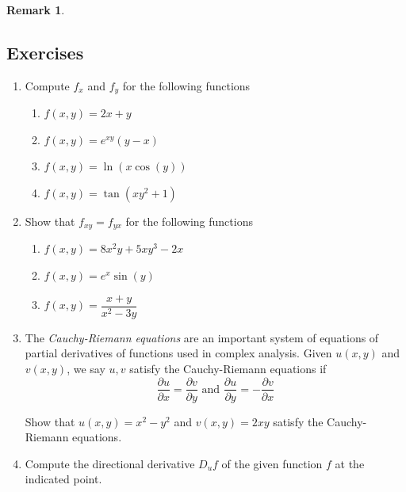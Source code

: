 \documentclass[12pt]{article}
\numberwithin{equation}{subsection}
\numberwithin{figure}{subsection}
\theoremstyle{note}
\newtheorem{remark}[subsection]{Remark}
\begin{document}
{\begin{remark}
\end{remark}





\subsection{Exercises}
\begin{enumerate}[label=\arabic*.]
\item Compute $f_x$ and $f_y$ for the following functions

\begin{enumerate}
	\item $f(x,y)=2x+y$
	\item $f(x,y)=e^{xy}(y-x)$
	\item $f(x,y)=\ln(x\cos(y))$
	\item $f(x,y)=\tan(xy^2+1)$
\end{enumerate}


\item Show that $f_{xy}=f_{yx}$ for the following functions

\begin{enumerate}
	\item $f(x,y)=8x^2y+5xy^3-2x$
	\item $f(x,y)=e^{x}\sin(y)$
	\item $f(x,y)=\dfrac{x+y}{x^2-3y}$
\end{enumerate}

\item The \textit{Cauchy-Riemann equations} are an important system of equations of partial derivatives of functions used in complex analysis. Given $u(x,y)$ and $v(x,y)$, we say $u,v$ satisfy the Cauchy-Riemann equations if 
\begin{equation} \dfrac{\partial u}{\partial x}=\dfrac{\partial v}{\partial y} \text{ and } \dfrac{\partial u}{\partial y}=-\dfrac{\partial v}{\partial x}\end{equation}

Show that $u(x,y)=x^2-y^2$ and $v(x,y)=2xy$ satisfy the Cauchy-Riemann equations. 





\item Compute the directional derivative $D_{u} f$ of the given function $f$ at the indicated point.


\end{enumerate}}
\end{document}
